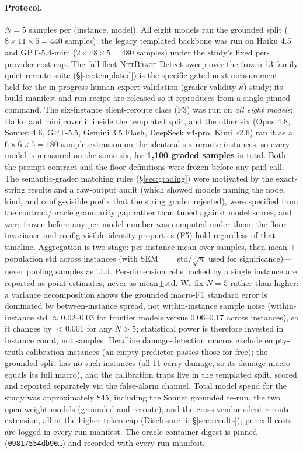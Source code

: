\documentclass[11pt]{article}
\newcommand{\netbrace}{\textsc{NetBrace}}
\begin{document}
\paragraph{Protocol.} $N{=}5$ samples per (instance, model). All eight models
ran the grounded split ($8 \times 11 \times 5 = 440$ samples); the legacy templated
backbone was run on Haiku 4.5 and GPT-5.4-mini ($2 \times 48 \times 5 = 480$
samples) under the study's fixed per-provider cost cap. The
full-fleet \netbrace{}-Detect sweep over the frozen 13-family quiet-reroute suite
(\S\ref{sec:templated}) is the specific gated next measurement---held for the
in-progress human-expert validation (grader-validity $\kappa$) study; its
build manifest and run recipe are released so it reproduces from a single
pinned command. The six-instance silent-reroute class (F3) was run on \emph{all eight
models}: Haiku and mini cover it inside the templated split, and the other six
(Opus 4.8, Sonnet 4.6, GPT-5.5, Gemini 3.5 Flash, DeepSeek v4-pro, Kimi k2.6)
ran it as a $6 \times 6 \times 5 = 180$-sample extension on the identical six
reroute instances, so every model is measured on the same six, for
\textbf{1{,}100 graded samples} in total. Both the prompt contract and the
floor definitions were frozen before any paid call. The semantic-grader
matching rules (\S\ref{sec:grading}) were motivated by the exact-string
results and a raw-output audit (which showed models naming the node, kind,
and config-visible prefix that the string grader rejected), were specified
from the contract/oracle granularity gap rather than tuned against model
scores, and were frozen before any per-model number was computed under
them; the floor-invariance and config-visible-identity properties (F5) hold
regardless of that timeline. Aggregation is two-stage: per-instance mean
over samples, then mean $\pm$ population std across instances (with
SEM~$=$~std$/\sqrt{n}$ used for significance)---never pooling samples
as i.i.d. Per-dimension cells backed by a single instance are reported as
point estimates, never as mean$\pm$std. We fix $N{=}5$ rather than higher: a
variance decomposition shows the grounded macro-F1 standard error is
dominated by between-instance spread, not within-instance sample noise
(within-instance std $\approx$0.02--0.03 for frontier models versus
0.06--0.17 across instances), so it changes by $<$0.001 for any $N>5$;
statistical power is therefore invested in instance count, not samples.
Headline damage-detection macros
exclude empty-truth calibration instances (an empty predictor passes those
for free); the grounded split has no such instances (all 11 carry damage, so
its damage-macro equals its full macro), and the calibration traps live in
the templated split, scored and reported separately via the false-alarm
channel. Total model spend for the study was approximately
\$45, including the Sonnet grounded re-run, the two open-weight models
(grounded and reroute), and the cross-vendor silent-reroute extension, all at
the higher token cap (Disclosure ii; \S\ref{sec:results}); per-call costs are
logged in every run manifest. The oracle container digest is pinned
(\texttt{09817554db90\ldots}) and recorded with every run manifest.
\end{document}
